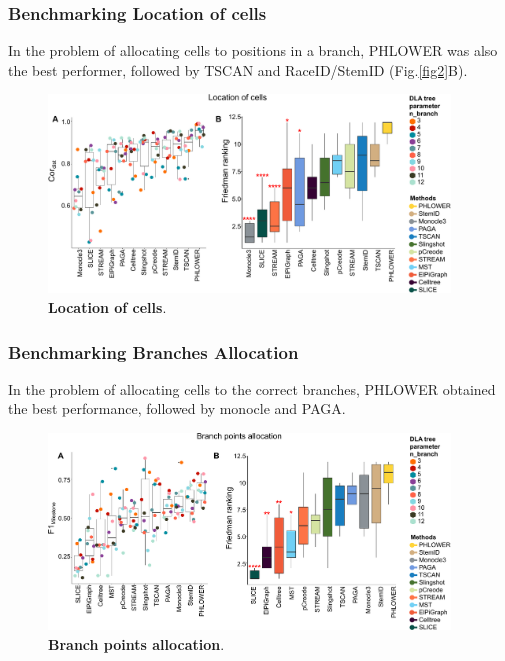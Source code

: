 \subsubsection{Benchmarking Location of cells}
In the problem of allocating cells to positions in a branch, PHLOWER was also the best performer, followed by TSCAN and RaceID/StemID (Fig.\ref{fig2}B).
\begin{figure}[!ht]
	\centering
	\includegraphics[width=0.95\textwidth]{Cordist/fig}
	\vspace{0.1cm}
	\caption[Location of cells]{
	\textbf{Location of cells}.}
	\label{fig:Cordist}
\end{figure}
\subsubsection{Benchmarking Branches Allocation}
In the problem of allocating cells to the correct branches, PHLOWER obtained the best performance, followed by monocle and PAGA. 
\begin{figure}[!ht]
	\centering
	\includegraphics[width=0.95\textwidth]{F1milestone/fig}
	\vspace{0.1cm}
	\caption[Branch points allocation]{
	\textbf{Branch points allocation}.}
	\label{fig:f1milestone}
\end{figure}
